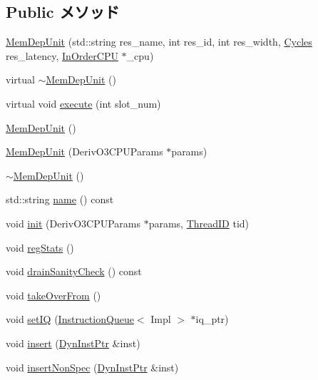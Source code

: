 \subsection*{Public メソッド}
\begin{DoxyCompactItemize}
\item 
\hyperlink{classMemDepUnit_a954662036e667fd17db64ae83226ff3f}{MemDepUnit} (std::string res\_\-name, int res\_\-id, int res\_\-width, \hyperlink{classCycles}{Cycles} res\_\-latency, \hyperlink{classInOrderCPU}{InOrderCPU} $\ast$\_\-cpu)
\item 
virtual \hyperlink{classMemDepUnit_a45331beda5c09d8c776b6bd7c1814b59}{$\sim$MemDepUnit} ()
\item 
virtual void \hyperlink{classMemDepUnit_a74d7cd749b79186057ad86f5f7b79fd2}{execute} (int slot\_\-num)
\item 
\hyperlink{classMemDepUnit_a6a36e6c9f97f9e122c96398a39f53c7e}{MemDepUnit} ()
\item 
\hyperlink{classMemDepUnit_ad6878b8c69951d1680a6fcc62866a18f}{MemDepUnit} (DerivO3CPUParams $\ast$params)
\item 
\hyperlink{classMemDepUnit_a45331beda5c09d8c776b6bd7c1814b59}{$\sim$MemDepUnit} ()
\item 
std::string \hyperlink{classMemDepUnit_a37627d5d5bba7f4a8690c71c2ab3cb07}{name} () const 
\item 
void \hyperlink{classMemDepUnit_a0b3a45df958cbefd5455ff2aa1418bb4}{init} (DerivO3CPUParams $\ast$params, \hyperlink{base_2types_8hh_ab39b1a4f9dad884694c7a74ed69e6a6b}{ThreadID} tid)
\item 
void \hyperlink{classMemDepUnit_a4dc637449366fcdfc4e764cdf12d9b11}{regStats} ()
\item 
void \hyperlink{classMemDepUnit_a0240eb42fa57fe5d3788093f62b77347}{drainSanityCheck} () const 
\item 
void \hyperlink{classMemDepUnit_a8674059ce345e23aac5086b2c3e24a43}{takeOverFrom} ()
\item 
void \hyperlink{classMemDepUnit_a9f2164f7d32d0906f0818ac724921840}{setIQ} (\hyperlink{classInstructionQueue}{InstructionQueue}$<$ Impl $>$ $\ast$iq\_\-ptr)
\item 
void \hyperlink{classMemDepUnit_a773e88db1aa010c3755e603493bf40ec}{insert} (\hyperlink{classRefCountingPtr}{DynInstPtr} \&inst)
\item 
void \hyperlink{classMemDepUnit_ad7036279ba36a8cfaf65554d1a5dbaac}{insertNonSpec} (\hyperlink{classRefCountingPtr}{DynInstPtr} \&inst)
\item 

\end{DoxyCompactItemize}
